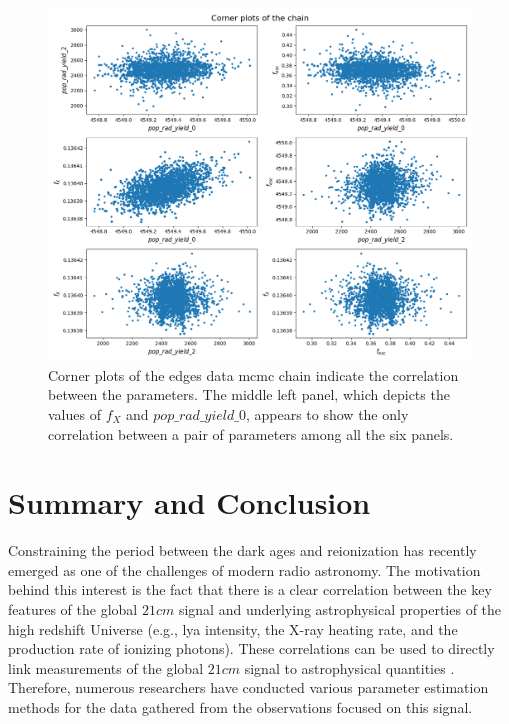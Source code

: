 \documentclass[12pt, TexShade, letterpaper]{report}
\begin{document}
\begin{figure}[h!]
\centering
\includegraphics[scale =0.5]{corner_plots_edges.png}
\caption[Corner plots of the \gls{edges} data \gls{mcmc} chain]{Corner plots of the \gls{edges} data \gls{mcmc} chain indicate the correlation between the parameters. The middle left panel, which depicts the values of $f_X$ and $pop\_rad\_yield\_0$, appears to show the only correlation between a pair of parameters among all the six panels.}
\label{fig:corner_plots_edges}
\end{figure}
\chapter{Summary and Conclusion}
\label{chap:discussion}
Constraining the period between the dark ages and reionization has recently emerged as one of the challenges of modern radio astronomy. The motivation behind this interest is the fact that there is a clear correlation between the key features of the global $21cm$ signal and underlying astrophysical properties of the high redshift Universe (e.g., \gls{lya} intensity, the X-ray heating rate, and the production rate of ionizing photons). These correlations can be used to directly link measurements of the global $21cm$ signal to astrophysical quantities \cite{chart_param_space}.
Therefore, numerous researchers have conducted various parameter estimation methods for the data gathered from the observations focused on this signal.\par
\end{document}
